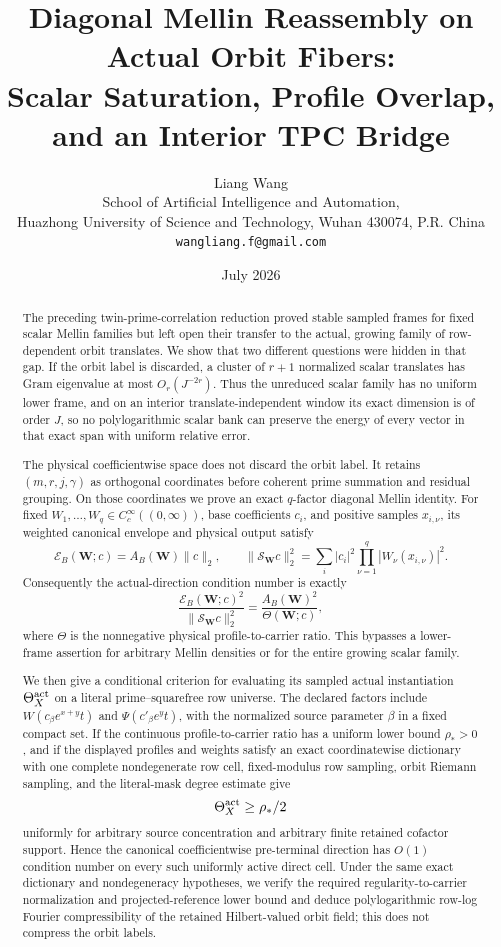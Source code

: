 \documentclass[11pt]{article}
\title{\bfseries Diagonal Mellin Reassembly on Actual Orbit Fibers:\\
Scalar Saturation, Profile Overlap,\\
and an Interior TPC Bridge}
\author{Liang Wang\\
\small School of Artificial Intelligence and Automation,\\[-2pt]
\small Huazhong University of Science and Technology, Wuhan 430074, P.R. China\\
\small \texttt{wangliang.f@gmail.com}}
\date{July 2026}
\theoremstyle{definition}
\theoremstyle{remark}
\newcommand{\cE}{\mathcal E}
\newcommand{\cS}{\mathcal S}
\begin{document}
\maketitle

\begin{abstract}
The preceding twin-prime-correlation reduction proved stable sampled
frames for fixed scalar Mellin families but left open their transfer to
the actual, growing family of row-dependent orbit translates.  We show
that two different questions were hidden in that gap.  If the orbit
label is discarded, a cluster of \(r+1\) normalized scalar translates
has Gram eigenvalue at most \(O_r(J^{-2r})\).  Thus the unreduced scalar
family has no uniform lower frame, and on an interior
translate-independent window its exact dimension is of order \(J\), so
no polylogarithmic scalar bank can preserve the energy of every vector in
that exact span with uniform relative error.

The physical coefficientwise space does not discard the orbit label.
It retains \((m,r,j,\gamma)\) as orthogonal coordinates before coherent
prime summation and residual grouping.  On those coordinates we prove
an exact \(q\)-factor diagonal Mellin identity.  For fixed
\(W_1,\ldots,W_q\in C_c^\infty((0,\infty))\), base coefficients \(c_i\),
and positive samples \(x_{i,\nu}\), its weighted canonical envelope and
physical output satisfy
\[
 \cE_B(\mathbf W;c)=A_B(\mathbf W)\|c\|_2,
 \qquad
 \|\cS_{\mathbf W}c\|_2^2
 =\sum_i|c_i|^2\prod_{\nu=1}^q|W_\nu(x_{i,\nu})|^2.
\]
Consequently the actual-direction condition number is exactly
\[
 \frac{\cE_B(\mathbf W;c)^2}{\|\cS_{\mathbf W}c\|_2^2}
 =\frac{A_B(\mathbf W)^2}{\Theta(\mathbf W;c)},
\]
where \(\Theta\) is the nonnegative physical profile-to-carrier ratio.
This bypasses a lower-frame assertion for arbitrary Mellin densities or
for the entire growing scalar family.

 We then give a conditional criterion for evaluating its sampled actual
instantiation \(\Theta_X^{\rm act}\) on a
literal prime--squarefree row universe.  The declared factors include
\(W(c_\beta e^{x+y}t)\) and
\(\Psi(c'_\beta e^yt)\), with the normalized source parameter
\(\beta\) in a fixed compact set.  If the continuous profile-to-carrier
ratio has a uniform lower bound \(\rho_*>0\), and if the displayed
profiles and weights satisfy an exact coordinatewise dictionary with one
complete nondegenerate row cell, fixed-modulus row sampling, orbit Riemann
sampling, and the literal-mask degree estimate give
\[
 \Theta_X^{\rm act}\ge \rho_*/2
\]
uniformly for arbitrary source concentration and arbitrary finite retained
cofactor support.  Hence the
canonical coefficientwise pre-terminal direction has \(O(1)\) condition
number on every such uniformly active direct cell.  Under the same exact
dictionary and nondegeneracy hypotheses, we verify the required
regularity-to-carrier normalization and projected-reference lower bound and
deduce polylogarithmic row-log Fourier compressibility of the retained
Hilbert-valued orbit field; this does not compress the orbit labels.


\end{abstract}
\end{document}
